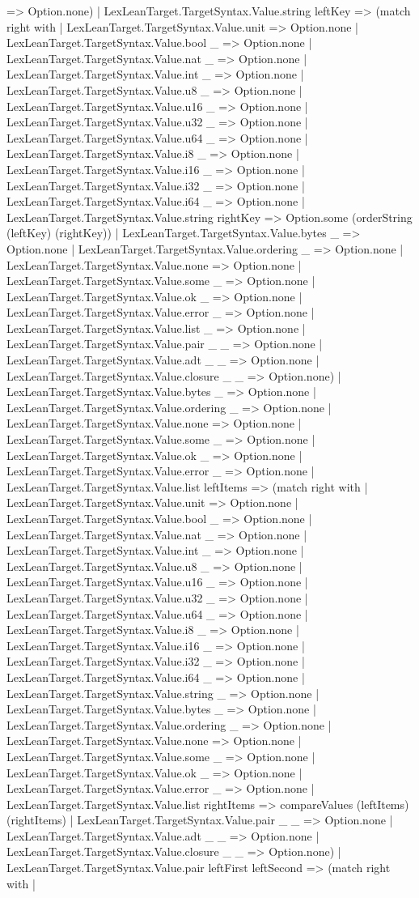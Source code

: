 \documentclass[11pt]{article}
\begin{document}
=> Option.none) | LexLeanTarget.TargetSyntax.Value.string leftKey => (match right with | LexLeanTarget.TargetSyntax.Value.unit => Option.none | LexLeanTarget.TargetSyntax.Value.bool \_ => Option.none | LexLeanTarget.TargetSyntax.Value.nat \_ => Option.none | LexLeanTarget.TargetSyntax.Value.int \_ => Option.none | LexLeanTarget.TargetSyntax.Value.u8 \_ => Option.none | LexLeanTarget.TargetSyntax.Value.u16 \_ => Option.none | LexLeanTarget.TargetSyntax.Value.u32 \_ => Option.none | LexLeanTarget.TargetSyntax.Value.u64 \_ => Option.none | LexLeanTarget.TargetSyntax.Value.i8 \_ => Option.none | LexLeanTarget.TargetSyntax.Value.i16 \_ => Option.none | LexLeanTarget.TargetSyntax.Value.i32 \_ => Option.none | LexLeanTarget.TargetSyntax.Value.i64 \_ => Option.none | LexLeanTarget.TargetSyntax.Value.string rightKey => Option.some (orderString (leftKey) (rightKey)) | LexLeanTarget.TargetSyntax.Value.bytes \_ => Option.none | LexLeanTarget.TargetSyntax.Value.ordering \_ => Option.none | LexLeanTarget.TargetSyntax.Value.none => Option.none | LexLeanTarget.TargetSyntax.Value.some \_ => Option.none | LexLeanTarget.TargetSyntax.Value.ok \_ => Option.none | LexLeanTarget.TargetSyntax.Value.error \_ => Option.none | LexLeanTarget.TargetSyntax.Value.list \_ => Option.none | LexLeanTarget.TargetSyntax.Value.pair \_ \_ => Option.none | LexLeanTarget.TargetSyntax.Value.adt \_ \_ => Option.none | LexLeanTarget.TargetSyntax.Value.closure \_ \_ => Option.none) | LexLeanTarget.TargetSyntax.Value.bytes \_ => Option.none | LexLeanTarget.TargetSyntax.Value.ordering \_ => Option.none | LexLeanTarget.TargetSyntax.Value.none => Option.none | LexLeanTarget.TargetSyntax.Value.some \_ => Option.none | LexLeanTarget.TargetSyntax.Value.ok \_ => Option.none | LexLeanTarget.TargetSyntax.Value.error \_ => Option.none | LexLeanTarget.TargetSyntax.Value.list leftItems => (match right with | LexLeanTarget.TargetSyntax.Value.unit => Option.none | LexLeanTarget.TargetSyntax.Value.bool \_ => Option.none | LexLeanTarget.TargetSyntax.Value.nat \_ => Option.none | LexLeanTarget.TargetSyntax.Value.int \_ => Option.none | LexLeanTarget.TargetSyntax.Value.u8 \_ => Option.none | LexLeanTarget.TargetSyntax.Value.u16 \_ => Option.none | LexLeanTarget.TargetSyntax.Value.u32 \_ => Option.none | LexLeanTarget.TargetSyntax.Value.u64 \_ => Option.none | LexLeanTarget.TargetSyntax.Value.i8 \_ => Option.none | LexLeanTarget.TargetSyntax.Value.i16 \_ => Option.none | LexLeanTarget.TargetSyntax.Value.i32 \_ => Option.none | LexLeanTarget.TargetSyntax.Value.i64 \_ => Option.none | LexLeanTarget.TargetSyntax.Value.string \_ => Option.none | LexLeanTarget.TargetSyntax.Value.bytes \_ => Option.none | LexLeanTarget.TargetSyntax.Value.ordering \_ => Option.none | LexLeanTarget.TargetSyntax.Value.none => Option.none | LexLeanTarget.TargetSyntax.Value.some \_ => Option.none | LexLeanTarget.TargetSyntax.Value.ok \_ => Option.none | LexLeanTarget.TargetSyntax.Value.error \_ => Option.none | LexLeanTarget.TargetSyntax.Value.list rightItems => compareValues (leftItems) (rightItems) | LexLeanTarget.TargetSyntax.Value.pair \_ \_ => Option.none | LexLeanTarget.TargetSyntax.Value.adt \_ \_ => Option.none | LexLeanTarget.TargetSyntax.Value.closure \_ \_ => Option.none) | LexLeanTarget.TargetSyntax.Value.pair leftFirst leftSecond => (match right with | 
\end{document}
